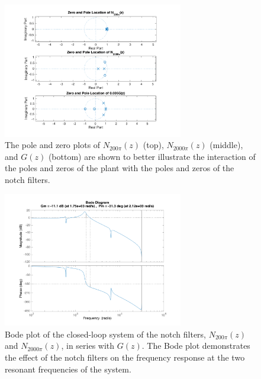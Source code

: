 \documentclass[11pt]{article}
\begin{document}
\begin{figure}[H]
    \centering
    \includegraphics[width=0.7\textwidth]{ECEN5458_gz_NF_zp.png}
    \caption{The pole and zero plots of $N_{200\pi}(z)$ (top), $N_{2000\pi}(z)$ (middle), and $G(z)$ (bottom) are shown to better illustrate the interaction of the poles and zeros of the plant with the poles and zeros of the notch filters.}
    \label{fig:gzNFzp}
\end{figure}  


\begin{figure}[H]
    \centering
    \includegraphics[width=0.7\textwidth]{Bode_NFandGz.png}
    \caption{Bode plot of the closed-loop system of the notch filters, $N_{200\pi}(z)$ and $N_{2000\pi}(z)$, in series with $G(z)$. The Bode plot demonstrates the effect of the notch filters on the frequency response at the two resonant frequencies of the system.}
    \label{fig:bodeNFGz}
\end{figure}  
\end{document}
